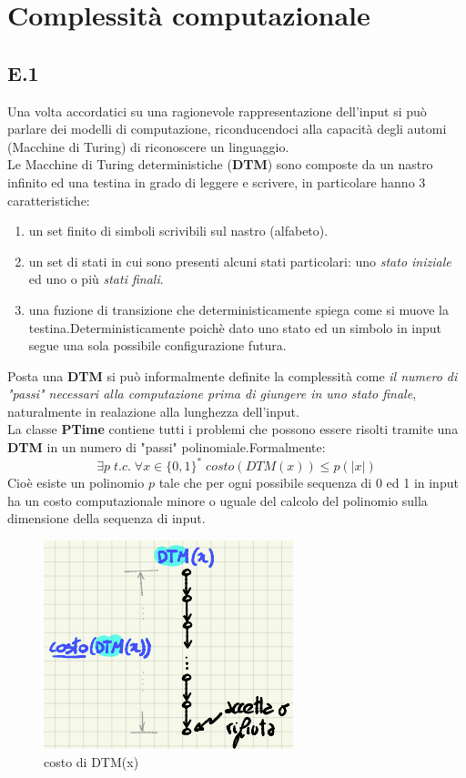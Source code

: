 \documentclass[a4paper]{article}
\begin{document}
\section{Complessità computazionale}
\subsection{E.1}
Una volta accordatici su una ragionevole rappresentazione dell'input si può parlare dei modelli di computazione, riconducendoci alla capacità degli automi (Macchine di Turing) di riconoscere un linguaggio.\\
Le Macchine di Turing deterministiche (\textbf{DTM}) sono composte da un nastro infinito ed una testina in grado di leggere e scrivere, in particolare hanno 3 caratteristiche:
\begin{enumerate}
	\item un set finito di simboli scrivibili sul nastro (alfabeto).
	\item un set di stati in cui sono presenti alcuni stati particolari: uno \textit{stato iniziale} ed uno o più \textit{stati finali}.
	\item una fuzione di transizione che deterministicamente spiega come si muove la testina.Deterministicamente poichè dato uno stato ed un simbolo in input segue una sola possibile configurazione futura.
\end{enumerate}
Posta una \textbf{DTM} si può informalmente definite la complessità come \textit{il numero di "passi" necessari alla computazione prima di giungere in uno stato finale}, naturalmente in realazione alla lunghezza dell'input.\\
La classe \textbf{PTime} contiene tutti i problemi che possono essere risolti tramite una \textbf{DTM} in un numero di "passi" polinomiale.Formalmente: $$\exists p \; t.c. \; \forall x \in \{0,1\}^* \; costo(DTM(x)) \leq p(\lvert x \rvert)$$
Cioè esiste un polinomio $p$ tale che per ogni possibile sequenza di 0 ed 1 in input ha un costo computazionale minore o uguale del calcolo del polinomio sulla dimensione della sequenza di input.
\begin{figure}[!ht]
\centering
\includegraphics[scale = 0.5]{./img/E1_DTM.png}
\caption{costo di DTM(x)} \label{FIG:E1_DTM}
\end{figure}
\end{document}
